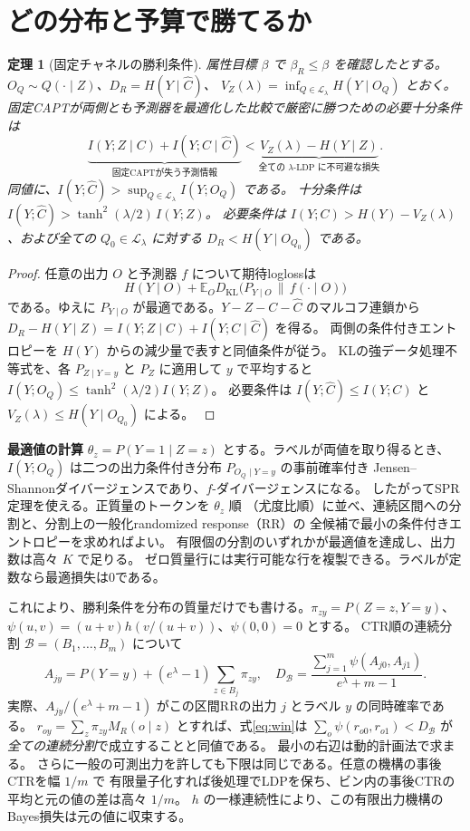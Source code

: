 \documentclass[a4paper,11pt]{ltjsarticle}
\theoremstyle{jp}
\newtheorem{thm}{定理}
\newcommand{\E}{\mathbb E}
\newcommand{\KL}{D_{\mathrm{KL}}}
\newcommand{\Dc}{D_R}
\newcommand{\V}{V_Z}
\newcommand{\cL}{\mathcal L}
\newcommand{\cx}{\widehat C}
\newcommand{\para}[1]{\par\Needspace{3\baselineskip}\addvspace{.6\baselineskip}\noindent\textbf{#1}\enspace}
\begin{document}
\section{どの分布と予算で勝てるか}

\begin{thm}[固定チャネルの勝利条件]\label{th:win}
属性目標 \(\beta\) で \(\beta_R\le\beta\) を確認したとする。
\(O_Q\sim Q(\cdot\mid Z)\)、\(\Dc=H(Y\mid\cx)\)、
\(\V(\lambda)=\inf_{Q\in\cL_\lambda}H(Y\mid O_Q)\) とおく。
固定CAPTが両側とも予測器を最適化した比較で厳密に勝つための必要十分条件は
\[
 \underbrace{I(Y;Z\mid C)+I(Y;C\mid\cx)}_{\text{固定CAPTが失う予測情報}}
 <\underbrace{\V(\lambda)-H(Y\mid Z)}_{\text{全ての }\lambda\text{-LDP に不可避な損失}} .
 \tag{1}\label{eq:win}
\]
同値に、\(I(Y;\cx)>\sup_{Q\in\cL_\lambda} I(Y;O_Q)\) である。
十分条件は
\(I(Y;\cx)>\tanh^2(\lambda/2)\,I(Y;Z)\)。
必要条件は \(I(Y;C)>H(Y)-\V(\lambda)\)、および全ての \(Q_0\in\cL_\lambda\) に対する
\(\Dc<H(Y\mid O_{Q_0})\) である。
\end{thm}
\begin{proof}
任意の出力 \(O\) と予測器 \(f\) について期待loglossは
\[
 H(Y\mid O)+\E_O\KL\bigl(P_{Y\mid O}\,\|\,f(\cdot\mid O)\bigr)
 \tag{2}\label{eq:bayes}
\]
である。ゆえに \(P_{Y\mid O}\) が最適である。\(Y-Z-C-\cx\) のマルコフ連鎖から
\(\Dc-H(Y\mid Z)=I(Y;Z\mid C)+I(Y;C\mid\cx)\) を得る。
両側の条件付きエントロピーを \(H(Y)\) からの減少量で表すと同値条件が従う。
KLの強データ処理不等式を、各 \(P_{Z\mid Y=y}\) と \(P_Z\) に適用して \(y\) で平均すると
\(I(Y;O_Q)\le\tanh^2(\lambda/2)I(Y;Z)\)。
必要条件は \(I(Y;\cx)\le I(Y;C)\) と \(\V(\lambda)\le H(Y\mid O_{Q_0})\) による。
\cite{sdpi}
\end{proof}

\para{最適値の計算}
\(\theta_z=P(Y=1\mid Z=z)\) とする。ラベルが両値を取り得るとき、
\(I(Y;O_Q)\) は二つの出力条件付き分布 \(P_{O_Q\mid Y=y}\) の事前確率付き
Jensen--Shannonダイバージェンスであり、\(f\)-ダイバージェンスになる。
したがってSPR定理を使える。正質量のトークンを \(\theta_z\) 順
（尤度比順）に並べ、連続区間への分割と、分割上の一般化randomized response（RR）の
全候補で最小の条件付きエントロピーを求めればよい。
有限個の分割のいずれかが最適値を達成し、出力数は高々 \(K\) で足りる。
ゼロ質量行には実行可能な行を複製できる。ラベルが定数なら最適損失は0である。
\cite{spr}

これにより、勝利条件を分布の質量だけでも書ける。\(\pi_{zy}=P(Z=z,Y=y)\)、
\(\psi(u,v)=(u+v)h(v/(u+v))\)、\(\psi(0,0)=0\) とする。
CTR順の連続分割 \(\mathcal B=(B_1,\ldots,B_m)\) について
\[
 A_{jy}=P(Y=y)+(e^\lambda-1)\sum_{z\in B_j}\pi_{zy},\quad
 D_{\mathcal B}=\frac{\sum_{j=1}^m\psi(A_{j0},A_{j1})}{e^\lambda+m-1}.
\]
実際、\(A_{jy}/(e^\lambda+m-1)\) がこの区間RRの出力 \(j\) とラベル \(y\) の同時確率である。
\(r_{oy}=\sum_z\pi_{zy}M_R(o\mid z)\) とすれば、式\eqref{eq:win}は
\(\sum_o\psi(r_{o0},r_{o1})<D_{\mathcal B}\) が\emph{全ての連続分割}で成立することと同値である。
最小の右辺は動的計画法で求まる。
さらに一般の可測出力を許しても下限は同じである。任意の機構の事後CTRを幅 \(1/m\) で
有限量子化すれば後処理でLDPを保ち、ビン内の事後CTRの平均と元の値の差は高々 \(1/m\)。
\(h\) の一様連続性により、この有限出力機構のBayes損失は元の値に収束する。
\end{document}
